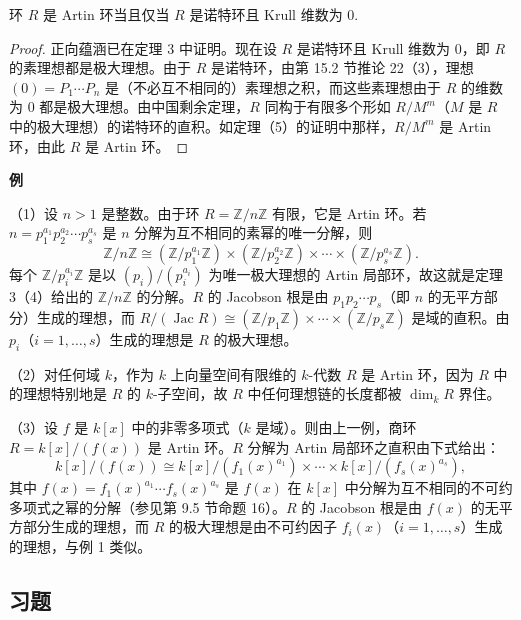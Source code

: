\begin{corollary}\label{cor:16.4}
环 \(R\) 是 Artin 环当且仅当 \(R\) 是诺特环且 Krull 维数为 0.
\end{corollary}

\begin{proof}
正向蕴涵已在定理 3 中证明。现在设 \(R\) 是诺特环且 Krull 维数为 0，即 \(R\) 的素理想都是极大理想。由于 \(R\) 是诺特环，由第 15.2 节推论 22（3），理想 \((0) = P_1\cdots P_n\) 是（不必互不相同的）素理想之积，而这些素理想由于 \(R\) 的维数为 0 都是极大理想。由中国剩余定理，\(R\) 同构于有限多个形如 \(R/M^m\)（\(M\) 是 \(R\) 中的极大理想）的诺特环的直积。如定理（5）的证明中那样，\(R/M^m\) 是 Artin 环，由此 \(R\) 是 Artin 环。
\end{proof}

\noindent\textbf{例}

（1）设 \(n > 1\) 是整数。由于环 \(R = \mathbb{Z}/n\mathbb{Z}\) 有限，它是 Artin 环。若 \(n = p_1^{a_1}p_2^{a_2}\cdots p_s^{a_s}\) 是 \(n\) 分解为互不相同的素幂的唯一分解，则
\[
\mathbb{Z}/n\mathbb{Z} \cong (\mathbb{Z}/p_1^{a_1}\mathbb{Z}) \times (\mathbb{Z}/p_2^{a_2}\mathbb{Z}) \times \cdots \times (\mathbb{Z}/p_s^{a_s}\mathbb{Z}).
\]
每个 \(\mathbb{Z}/p_i^{a_i}\mathbb{Z}\) 是以 \((p_i)/(p_i^{a_i})\) 为唯一极大理想的 Artin 局部环，故这就是定理 3（4）给出的 \(\mathbb{Z}/n\mathbb{Z}\) 的分解。\(R\) 的 Jacobson 根是由 \(p_1p_2\cdots p_s\)（即 \(n\) 的无平方部分）生成的理想，而 \(R/(\operatorname{Jac}R) \cong (\mathbb{Z}/p_1\mathbb{Z}) \times \cdots \times (\mathbb{Z}/p_s\mathbb{Z})\) 是域的直积。由 \(p_i\)（\(i = 1, \ldots, s\)）生成的理想是 \(R\) 的极大理想。

（2）对任何域 \(k\)，作为 \(k\) 上向量空间有限维的 \(k\)-代数 \(R\) 是 Artin 环，因为 \(R\) 中的理想特别地是 \(R\) 的 \(k\)-子空间，故 \(R\) 中任何理想链的长度都被 \(\dim_kR\) 界住。

（3）设 \(f\) 是 \(k[x]\) 中的非零多项式（\(k\) 是域）。则由上一例，商环 \(R = k[x]/(f(x))\) 是 Artin 环。\(R\) 分解为 Artin 局部环之直积由下式给出：
\[
k[x]/(f(x)) \cong k[x]/(f_1(x)^{a_1}) \times \cdots \times k[x]/(f_s(x)^{a_s}),
\]
其中 \(f(x) = f_1(x)^{a_1}\cdots f_s(x)^{a_s}\) 是 \(f(x)\) 在 \(k[x]\) 中分解为互不相同的不可约多项式之幂的分解（参见第 9.5 节命题 16）。\(R\) 的 Jacobson 根是由 \(f(x)\) 的无平方部分生成的理想，而 \(R\) 的极大理想是由不可约因子 \(f_i(x)\)（\(i = 1, \ldots, s\)）生成的理想，与例 1 类似。

\subsection*{习题}

